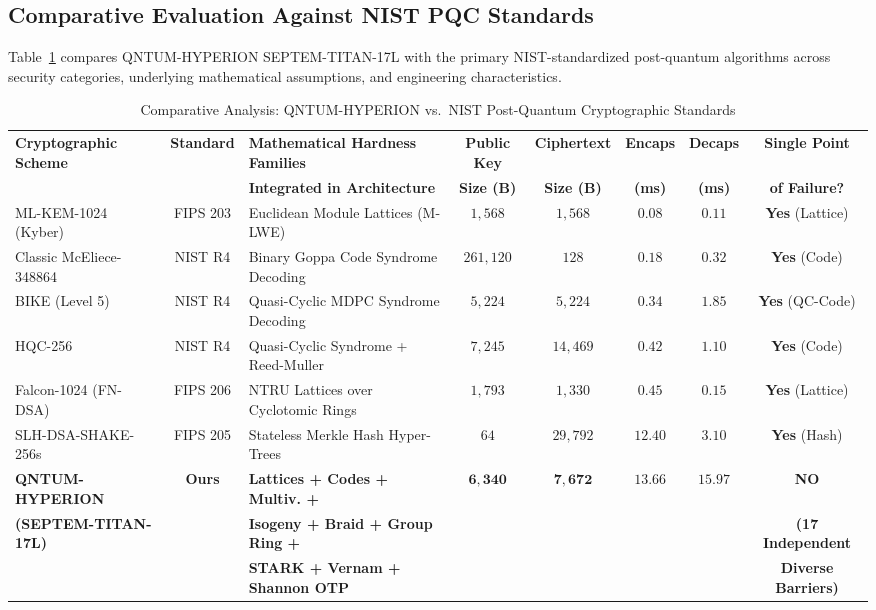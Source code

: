 \documentclass{ieeeaccess}
\begin{document}
\subsection{Comparative Evaluation Against NIST PQC Standards}
Table~\ref{tab:nist_comparison} compares \textsc{QNTUM-HYPERION SEPTEM-TITAN-17L} with the primary NIST-standardized post-quantum algorithms across security categories, underlying mathematical assumptions, and engineering characteristics.

\begin{table}[!t]
\centering
\caption{Comparative Analysis: QNTUM-HYPERION vs.\ NIST Post-Quantum Cryptographic Standards}
\label{tab:nist_comparison}
\renewcommand{\arraystretch}{1.2}
\footnotesize
\begin{tabular}{@{}l c p{3.8cm} c c c c c@{}}
\toprule
\textbf{Cryptographic Scheme} & \textbf{Standard} & \textbf{Mathematical Hardness Families} & \textbf{Public Key} & \textbf{Ciphertext} & \textbf{Encaps} & \textbf{Decaps} & \textbf{Single Point} \\
 & & \textbf{Integrated in Architecture} & \textbf{Size (B)} & \textbf{Size (B)} & \textbf{(ms)} & \textbf{(ms)} & \textbf{of Failure?} \\
\midrule
ML-KEM-1024 (Kyber)       & FIPS 203 & Euclidean Module Lattices (M-LWE)      & $1{,}568$  & $1{,}568$  & $0.08$  & $0.11$  & \textbf{Yes} (Lattice) \\
Classic McEliece-348864   & NIST R4  & Binary Goppa Code Syndrome Decoding   & $261{,}120$& $128$      & $0.18$  & $0.32$  & \textbf{Yes} (Code) \\
BIKE (Level 5)            & NIST R4  & Quasi-Cyclic MDPC Syndrome Decoding   & $5{,}224$  & $5{,}224$  & $0.34$  & $1.85$  & \textbf{Yes} (QC-Code) \\
HQC-256                   & NIST R4  & Quasi-Cyclic Syndrome + Reed-Muller   & $7{,}245$  & $14{,}469$ & $0.42$  & $1.10$  & \textbf{Yes} (Code) \\
Falcon-1024 (FN-DSA)      & FIPS 206 & NTRU Lattices over Cyclotomic Rings   & $1{,}793$  & $1{,}330$  & $0.45$  & $0.15$  & \textbf{Yes} (Lattice) \\
SLH-DSA-SHAKE-256s        & FIPS 205 & Stateless Merkle Hash Hyper-Trees     & $64$       & $29{,}792$ & $12.40$ & $3.10$  & \textbf{Yes} (Hash) \\
\midrule
\textbf{QNTUM-HYPERION}   & \textbf{Ours} & \textbf{Lattices + Codes + Multiv. +} & $\mathbf{6{,}340}$ & $\mathbf{7{,}672}$ & $\mathbf{13.66}$ & $\mathbf{15.97}$ & \textbf{NO} \\
\textbf{(SEPTEM-TITAN-17L)}& & \textbf{Isogeny + Braid + Group Ring +} & & & & & \textbf{(17 Independent} \\
                           & & \textbf{STARK + Vernam + Shannon OTP}   & & & & & \textbf{Diverse Barriers)} \\
\bottomrule
\end{tabular}
\end{table}
\end{document}
